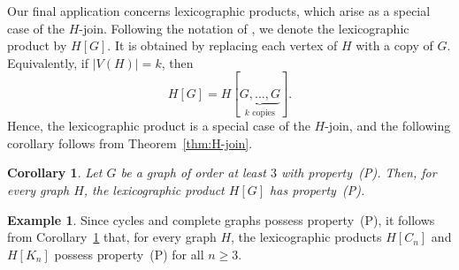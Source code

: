 \documentclass[12pt,reqno]{amsart}
\newtheorem{cor}[thm]{Corollary}
\theoremstyle{definition}
\newtheorem{example}[thm]{Example}
\numberwithin{equation}{subsection}
\numberwithin{equation}{section}
\begin{document}
Our final application concerns lexicographic products, which arise as a special case of the $H$-join.
Following the notation of \cite[p.~393]{west}, we denote the lexicographic product by $H[G]$. It is obtained by replacing each vertex of $H$ with a copy of $G$. Equivalently, if $|V(H)|=k$, then
$$
H[G] = H[\underbrace{G,\ldots,G}_{k\text{ copies}}].
$$
Hence, the lexicographic product is a special case of the $H$-join, and the following corollary follows from Theorem~\ref{thm:H-join}.

\begin{cor}\label{cor:lexicographic-product}
Let $G$ be a graph of order at least $3$ with property~(P). Then, for every graph $H$, the lexicographic product $H[G]$ has property~(P).
\end{cor}

\begin{example}
Since cycles and complete graphs possess property~(P), it follows from Corollary~\ref{cor:lexicographic-product} that, for every graph \(H\), the lexicographic products \(H[C_n]\) and \(H[K_n]\) possess property~(P) for all \(n \ge 3\).
\end{example}

\end{document}
